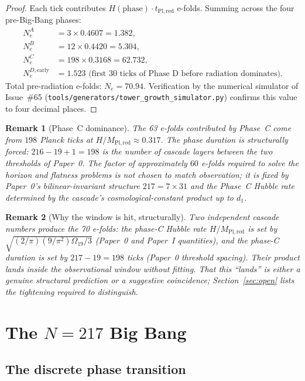 \documentclass[12pt,a4paper]{article}
\newtheorem*{remark}{Remark}
\begin{document}
\begin{proof}
Each tick contributes $H(\mathrm{phase}) \cdot t_{\mathrm{Pl,red}}$ e-folds.
Summing across the four pre-Big-Bang phases:
\begin{align*}
N_e^{A} &= 3 \times 0.4607 = 1.382, \\
N_e^{B} &= 12 \times 0.4420 = 5.304, \\
N_e^{C} &= 198 \times 0.3168 = 62.732, \\
N_e^{D, \mathrm{early}} &= 1.523 \text{ (first 30 ticks of Phase~D before radiation dominates).}
\end{align*}
Total pre-radiation e-folds: $N_e = 70.94$. Verification by the numerical
simulator of Issue~\#65 (\texttt{tools/generators/tower\_growth\_simulator.py}) confirms
this value to four decimal places.
\end{proof}

\begin{remark}[Phase~C dominance]
The 63 e-folds contributed by Phase~C come from $198$ Planck ticks at
$H/M_{\mathrm{Pl,red}} \approx 0.317$. The phase duration is structurally
forced: $216 - 19 + 1 = 198$ is the number of cascade layers between the two
thresholds of Paper~0. The factor of approximately $60$ e-folds required to
solve the horizon and flatness problems is not chosen to match observation; it
is fixed by Paper~0's bilinear-invariant structure $217 = 7 \times 31$ and the
Phase~C Hubble rate determined by the cascade's cosmological-constant product
up to $d_1$.
\end{remark}

\begin{remark}[Why the window is hit, structurally]
Two independent cascade numbers produce the 70 e-folds: the phase-C Hubble
rate $H/M_{\mathrm{Pl,red}}$ is set by $\sqrt{(2/\pi)(9/\pi^2)\Omega_{19}/3}$
(Paper~0 and Paper~I quantities), and the phase-C duration is set by
$217 - 19 = 198$ ticks (Paper~0 threshold spacing). Their product lands inside
the observational window without fitting. That this ``lands'' is either a
genuine structural prediction or a suggestive coincidence; Section~\ref{sec:open}
lists the tightening required to distinguish.
\end{remark}

\section{The \texorpdfstring{$N = 217$}{N = 217} Big Bang}
\label{sec:bigbang}

\subsection{The discrete phase transition}
\end{document}
